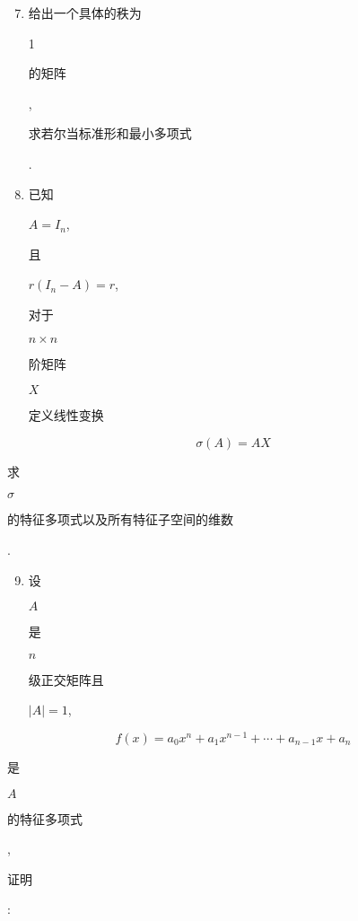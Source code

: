 \documentclass[10pt]{article}
\begin{document}
\begin{enumerate}
  \setcounter{enumi}{6}
  \item \begin{CJK}{UTF8}{mj}给出一个具体的秩为\end{CJK} 1 \begin{CJK}{UTF8}{mj}的矩阵\end{CJK}, \begin{CJK}{UTF8}{mj}求若尔当标准形和最小多项式\end{CJK}.

  \item \begin{CJK}{UTF8}{mj}已知\end{CJK} $A=I_{n}$, \begin{CJK}{UTF8}{mj}且\end{CJK} $r\left(I_{n}-A\right)=r$, \begin{CJK}{UTF8}{mj}对于\end{CJK} $n \times n$ \begin{CJK}{UTF8}{mj}阶矩阵\end{CJK} $X$ \begin{CJK}{UTF8}{mj}定义线性变换\end{CJK}

\end{enumerate}
$$
\sigma(A)=A X
$$
\begin{CJK}{UTF8}{mj}求\end{CJK} $\sigma$ \begin{CJK}{UTF8}{mj}的特征多项式以及所有特征子空间的维数\end{CJK}.

\begin{enumerate}
  \setcounter{enumi}{8}
  \item \begin{CJK}{UTF8}{mj}设\end{CJK} $A$ \begin{CJK}{UTF8}{mj}是\end{CJK} $n$ \begin{CJK}{UTF8}{mj}级正交矩阵且\end{CJK} $|A|=1$,
\end{enumerate}
$$
f(x)=a_{0} x^{n}+a_{1} x^{n-1}+\cdots+a_{n-1} x+a_{n}
$$
\begin{CJK}{UTF8}{mj}是\end{CJK} $A$ \begin{CJK}{UTF8}{mj}的特征多项式\end{CJK}, \begin{CJK}{UTF8}{mj}证明\end{CJK}:
\end{document}
